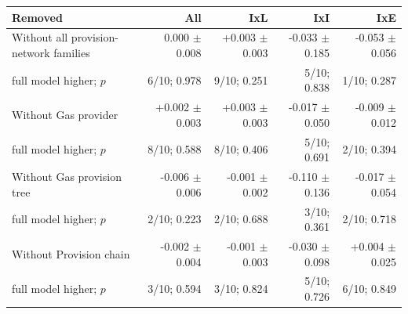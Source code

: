 \begin{tabular}{lrrrr}
\toprule
Removed & All & IxL & IxI & IxE \\
\midrule
Without all provision-network families & 0.000 $\pm$ 0.008 & +0.003 $\pm$ 0.003 & -0.033 $\pm$ 0.185 & -0.053 $\pm$ 0.056 \\
\quad full model higher; $p$ & 6/10; 0.978 & 9/10; 0.251 & 5/10; 0.838 & 1/10; 0.287 \\
Without Gas provider & +0.002 $\pm$ 0.003 & +0.003 $\pm$ 0.003 & -0.017 $\pm$ 0.050 & -0.009 $\pm$ 0.012 \\
\quad full model higher; $p$ & 8/10; 0.588 & 8/10; 0.406 & 5/10; 0.691 & 2/10; 0.394 \\
Without Gas provision tree & -0.006 $\pm$ 0.006 & -0.001 $\pm$ 0.002 & -0.110 $\pm$ 0.136 & -0.017 $\pm$ 0.054 \\
\quad full model higher; $p$ & 2/10; 0.223 & 2/10; 0.688 & 3/10; 0.361 & 2/10; 0.718 \\
Without Provision chain & -0.002 $\pm$ 0.004 & -0.001 $\pm$ 0.003 & -0.030 $\pm$ 0.098 & +0.004 $\pm$ 0.025 \\
\quad full model higher; $p$ & 3/10; 0.594 & 3/10; 0.824 & 5/10; 0.726 & 6/10; 0.849 \\
\bottomrule
\end{tabular}
